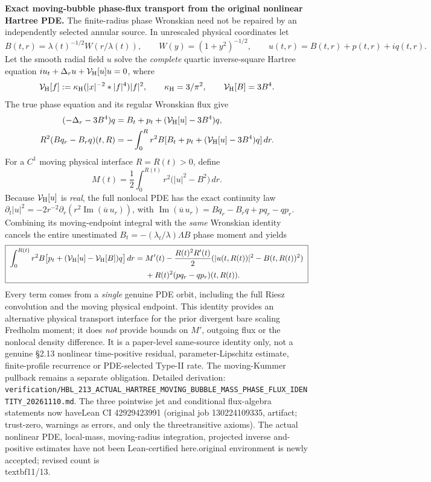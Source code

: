\documentclass[11pt]{amsart}
\begin{document}
\medskip
\noindent\textbf{Exact moving-bubble phase-flux transport from the original nonlinear Hartree PDE.}
The finite-radius phase Wronskian need not be repaired by an
independently selected annular source.  In unrescaled physical
coordinates let
\[
  B(t,r)=\lambda(t)^{-1/2}W(r/\lambda(t)),\qquad
  W(y)=(1+y^2)^{-1/2},\qquad
  u(t,r)=B(t,r)+p(t,r)+iq(t,r).
\]
Let the smooth radial field \(u\) solve the \emph{complete} quartic
inverse-square Hartree equation
\(iu_t+\Delta_ru+\mathcal V_{\rm H}[u]u=0\), where
\[
  \mathcal V_{\rm H}[f]
  :=\kappa_{\rm H}(|x|^{-2}*|f|^4)|f|^2,\qquad
  \kappa_{\rm H}=3/\pi^2,\qquad
  \mathcal V_{\rm H}[B]=3B^4.
\]
The true phase equation and its regular Wronskian flux give
\[
 \begin{aligned}
 (-\Delta_r-3B^4)q
 &= B_t+p_t+(\mathcal V_{\rm H}[u]-3B^4)q,\\
 R^2(Bq_r-B_rq)(t,R)
 &=-\int_0^R r^2B
    [B_t+p_t+(\mathcal V_{\rm H}[u]-3B^4)q]\,dr.
 \end{aligned}
\]
For a \(C^1\) moving physical interface \(R=R(t)>0\), define
\[
 M(t)=\frac12\int_0^{R(t)}
        r^2\bigl(|u|^2-B^2\bigr)\,dr.
\]
Because \(\mathcal V_{\rm H}[u]\) is \emph{real},
the full nonlocal PDE has the exact continuity law
\(\partial_t|u|^2=-2r^{-2}\partial_r
(r^2\operatorname{Im}(\overline u\,u_r))\), with
\(\operatorname{Im}(\overline u\,u_r)
 =Bq_r-B_rq+pq_r-qp_r\).
Combining its moving-endpoint integral with the
\emph{same} Wronskian identity cancels the entire
unestimated \(B_t=-(\lambda_t/\lambda)\Lambda B\) phase
moment and yields
\[
 \boxed{\;
 \begin{aligned}
 \int_0^{R(t)}r^2B\bigl[
 p_t+(\mathcal V_{\rm H}[u]-\mathcal V_{\rm H}[B])q
 \bigr]\,dr
 ={}&M'(t)
 -\frac{R(t)^2R'(t)}2
   (|u(t,R(t))|^2-B(t,R(t))^2)\\
 &+R(t)^2(pq_r-qp_r)(t,R(t)).
 \end{aligned}\;}
\]
Every term comes from a \emph{single} genuine PDE orbit, including
the full Riesz convolution and the moving physical endpoint.
This identity provides an alternative physical transport interface
for the prior divergent bare scaling Fredholm moment; it
does \emph{not} provide bounds on \(M'\), outgoing flux or
the nonlocal density difference. It is a paper-level
same-source identity only, not a genuine §2.13 nonlinear
time-positive residual, parameter-Lipschitz estimate,
finite-profile recurrence or PDE-selected Type-II rate.
The moving-Kummer pullback remains a separate obligation.
Detailed derivation:
\texttt{verification/HBL\_213\_ACTUAL\_HARTREE\_MOVING\_BUBBLE\_MASS\_PHASE\_FLUX\_IDENTITY\_20261110.md}.
The three pointwise jet and conditional flux-algebra statements now have\nstrict Lean CI 42929423991 (original job 130224109335, artifact; trust-zero, warnings as errors, and only the three\npermitted transitive axioms). The actual nonlinear PDE, local-mass\ndifferentiation, moving-radius integration, projected inverse and\ntime-positive estimates have not been Lean-certified here.\nNo original environment is newly accepted; revised count is\n\\textbf{11/13}.
\end{document}
